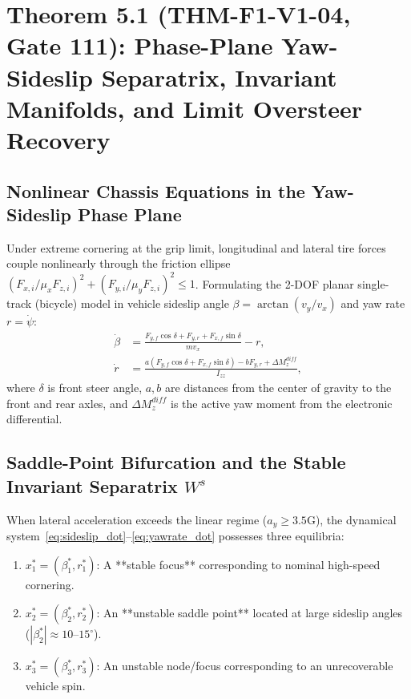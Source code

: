 \documentclass[11pt,a4paper,reqno]{article}
\def\bm#1{#1}%
\def\texttt#1{#1}%
\def\mathrm#1{#1}%
\theoremstyle{plain}
\theoremstyle{definition}
\theoremstyle{remark}
\numberwithin{equation}{section}
\begin{document}
\section{\texorpdfstring{Theorem 5.1 (\texttt{THM-F1-V1-04}, Gate 111): Phase-Plane Yaw-Sideslip Separatrix, Invariant Manifolds, and Limit Oversteer Recovery}{Theorem 5.1 (THM-F1-V1-04, Gate 111): Phase-Plane Yaw-Sideslip Separatrix, Invariant Manifolds, and Limit Oversteer Recovery}}

\subsection{Nonlinear Chassis Equations in the Yaw-Sideslip Phase Plane}
Under extreme cornering at the grip limit, longitudinal and lateral tire forces couple nonlinearly through the friction ellipse $(F_{x,i}/\mu_x F_{z,i})^2 + (F_{y,i}/\mu_y F_{z,i})^2 \le 1$. Formulating the 2-DOF planar single-track (bicycle) model \cite{Milliken1995} in vehicle sideslip angle $\beta = \arctan(v_y / v_x)$ and yaw rate $r = \dot{\psi}$:
\begin{align}
  \dot{\beta} &= \frac{F_{y,f}\cos\delta + F_{y,r} + F_{x,f}\sin\delta}{m v_x} - r, \label{eq:sideslip_dot} \\
  \dot{r} &= \frac{a\left(F_{y,f}\cos\delta + F_{x,f}\sin\delta\right) - b F_{y,r} + \Delta M_z^{\mathrm{diff}}}{I_{zz}}, \label{eq:yawrate_dot}
\end{align}
where $\delta$ is front steer angle, $a, b$ are distances from the center of gravity to the front and rear axles, and $\Delta M_z^{\mathrm{diff}}$ is the active yaw moment from the electronic differential.

\subsection{\texorpdfstring{Saddle-Point Bifurcation and the Stable Invariant Separatrix $W^s$}{Saddle-Point Bifurcation and the Stable Invariant Separatrix W\textasciicircum s}}
When lateral acceleration exceeds the linear regime ($a_y \ge 3.5\text{G}$), the dynamical system~\eqref{eq:sideslip_dot}--\eqref{eq:yawrate_dot} possesses three equilibria:
\begin{enumerate}
  \item $\bm{x}_1^* = (\beta_1^*, r_1^*)$: A **stable focus** corresponding to nominal high-speed cornering.
  \item $\bm{x}_2^* = (\beta_2^*, r_2^*)$: An **unstable saddle point** located at large sideslip angles ($|\beta_2^*| \approx 10\text{--}15^\circ$).
  \item $\bm{x}_3^* = (\beta_3^*, r_3^*)$: An unstable node/focus corresponding to an unrecoverable vehicle spin.
\end{enumerate}
\end{document}

